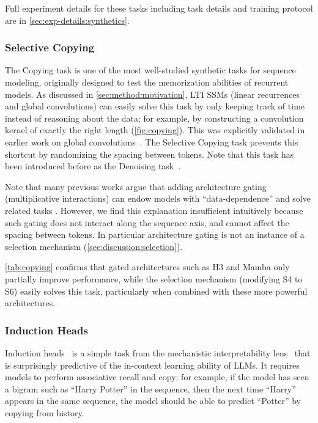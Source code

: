 Full experiment details for these tasks including task details and training protocol are in \cref{sec:exp-details:synthetics}.

\subsubsection{Selective Copying}


The Copying task is one of the most well-studied synthetic tasks for sequence modeling,
originally designed to test the memorization abilities of recurrent models.
As discussed in \cref{sec:method:motivation}, LTI SSMs (linear recurrences and global convolutions)
can easily solve this task by only keeping track of time instead of reasoning about the data;
for example, by constructing a convolution kernel of exactly the right length (\cref{fig:copying}).
This was explicitly validated in earlier work on global convolutions~\citep{romero2021ckconv}.
The Selective Copying task prevents this shortcut by randomizing the spacing between tokens.
Note that this task has been introduced before as the Denoising task~\citep{jing2019gated}.

Note that many previous works argue that adding architecture gating (multiplicative interactions) can endow models with ``data-dependence'' and solve related tasks \citep{dao2023hungry,poli2023hyena}.
However, we find this explanation insufficient intuitively because such gating does not interact along the sequence axis, and cannot affect the spacing between tokens.
In particular architecture gating is not an instance of a selection mechanism (\cref{sec:discussion:selection}).

\cref{tab:copying} confirms that gated architectures such as H3 and Mamba only partially improve performance,
while the selection mechanism (modifying S4 to S6) easily solves this task, particularly when combined with these more powerful architectures.



\subsubsection{Induction Heads}

Induction heads~\citep{olsson2022context} is a simple task from the mechanistic interpretability lens~\citep{elhage2021mathematical} that is surprisingly predictive of the in-context learning ability of LLMs. It requires models to perform associative recall and copy: for example, if the model has seen a bigram such as ``Harry Potter'' in the sequence, then the next time ``Harry'' appears in the same sequence, the model should be able to predict ``Potter'' by copying from history.

